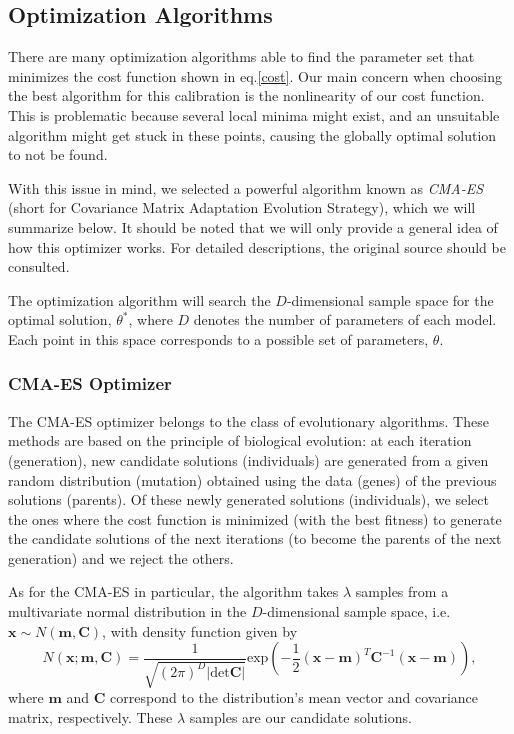 \subsection{Optimization Algorithms}
There are many optimization algorithms able to find the parameter set that minimizes the cost function shown in eq.\eqref{cost}.
Our main concern when choosing the best algorithm for this calibration is the nonlinearity of our cost function. This is problematic because several local minima might exist, and an unsuitable algorithm might get stuck in these points, causing the globally optimal solution to not be found.

With this issue in mind, we selected a powerful algorithm known as \emph{CMA-ES}~\citep{Hansen2} (short for Covariance Matrix Adaptation Evolution Strategy), which we will summarize below. It should be noted that we will only provide a general idea of how this optimizer works. For detailed descriptions, the original source should be consulted.

The optimization algorithm will search the $D$-dimensional sample space for the optimal solution, $\theta^{*}$, where $D$ denotes the number of parameters of each model. Each point in this space corresponds to a possible set of parameters, $\theta$.




\subsubsection{CMA-ES Optimizer}
The CMA-ES optimizer belongs to the class of evolutionary algorithms. These methods are based on the principle of biological evolution: at each iteration (generation), new candidate solutions (individuals) are generated from a given random distribution (mutation) obtained using the data (genes) of the previous solutions (parents). Of these newly generated solutions (individuals), we select the ones where the cost function is minimized (with the best fitness) to generate the candidate solutions of the next iterations (to become the parents of the next generation) and we reject the others.



As for the CMA-ES in particular, the algorithm takes $\lambda$ samples from a multivariate normal distribution in the $D$-dimensional sample space, i.e. $\mathbf{x}\sim N(\mathbf{m,C})$, with density function given by
\begin{equation}
N(\mathbf{x;m,C})=\frac{1}{\sqrt{(2\pi)^D|\mathrm{det}\mathbf{C}|}}\mathrm{exp}\left(-\frac{1}{2}(\mathbf{x}-\mathbf{m})^T\mathbf{C}^{-1}(\mathbf{x}-\mathbf{m})\right),
\end{equation}
\noindent where $\mathbf{m}$ and $\mathbf{C}$ correspond to the distribution's mean vector and covariance matrix, respectively.
These $\lambda$ samples are our candidate solutions.

